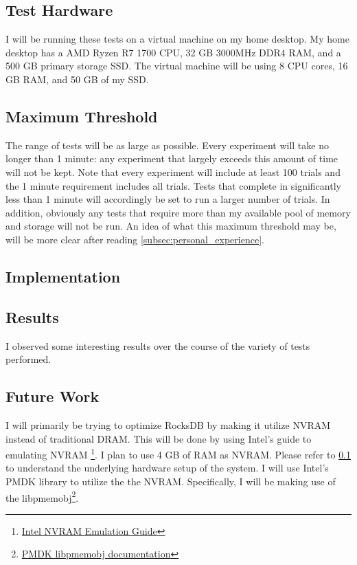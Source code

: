 \documentclass{article}
\begin{document}
\subsection{Test Hardware}
\label{subsec:test_hw}

I will be running these tests on a virtual machine on my home desktop. My home
desktop has a AMD Ryzen R7 1700 CPU, 32 GB 3000MHz DDR4 RAM, and a 500 GB
primary storage SSD. The virtual machine will be using 8 CPU cores, 16 GB RAM,
and 50 GB of my SSD.

\subsection{Maximum Threshold}
\label{subsec:max_threshold}

The range of tests will be as large as possible. Every experiment will take no
longer than 1 minute: any experiment that largely exceeds this amount of time
will not be kept. Note that every experiment will include at least 100 trials
and the 1 minute requirement includes all trials. Tests that complete in
significantly less than 1 minute will accordingly be set to run a larger number
of trials. In addition, obviously any tests that require more than my available
pool of memory and storage will not be run. An idea of what this maximum
threshold may be, will be more clear after reading
\ref{subsec:personal_experience}.

\subsection{Implementation}


\subsection{Results}


I observed some interesting results over the course of the variety of tests
performed.

\subsection{Future Work}
\label{sec:future_work}

I will primarily be trying to optimize RocksDB by making it utilize NVRAM
instead of traditional DRAM. This will be done by using Intel's guide to
emulating NVRAM
\footnote{
  \href{https://software.intel.com/en-us/articles/how-to-emulate-persistent-memory-on-an-intel-architecture-server/}
  {Intel NVRAM Emulation Guide}}.
I plan to use 4 GB of RAM as NVRAM. Please refer to \ref{subsec:test_hw} to
understand the underlying hardware setup of the system. I will use Intel's PMDK
library to utilize the the NVRAM. Specifically, I will be making use of the
libpmemobj\footnote{\href{http://pmem.io/pmdk/libpmemobj/}
{PMDK libpmemobj documentation}}.
\end{document}
